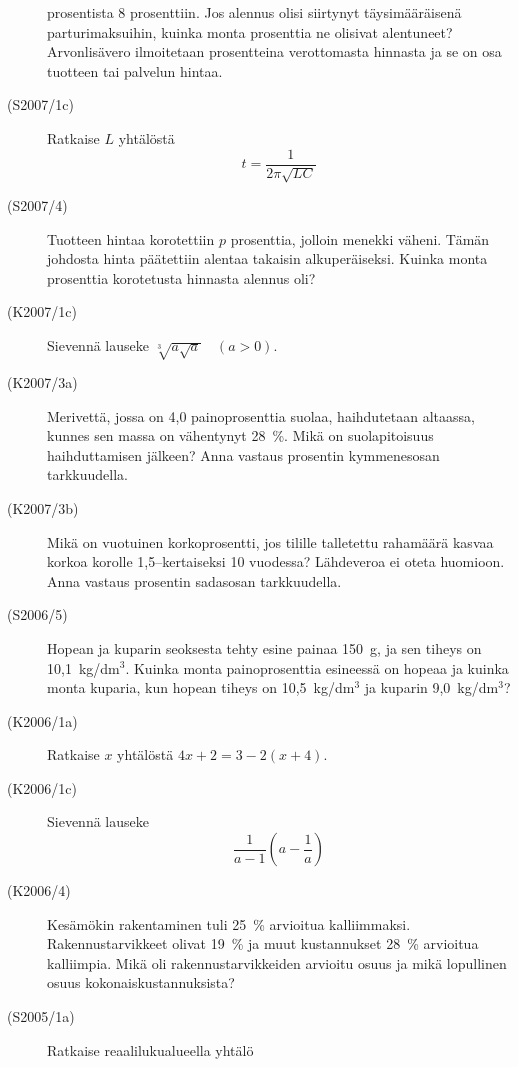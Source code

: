 \begin{description}
                        prosentista 8 prosenttiin. Jos alennus olisi siirtynyt
                        täysimääräisenä parturimaksuihin, kuinka monta prosenttia
                        ne olisivat alentuneet? Arvonlisävero ilmoitetaan prosentteina
                        verottomasta hinnasta ja se on osa tuotteen tai palvelun hintaa.
    \item[(S2007/1c)]  Ratkaise $L$ yhtälöstä
                        \[ t = \frac{1}{2\pi\sqrt{LC}} \]
    \item[(S2007/4)]   Tuotteen hintaa korotettiin $p$ prosenttia, jolloin menekki väheni.
                        Tämän johdosta hinta päätettiin alentaa takaisin alkuperäiseksi.
                        Kuinka monta prosenttia korotetusta hinnasta alennus oli?
    \item[(K2007/1c)]  Sievennä lauseke $ \sqrt[3]{a \sqrt{a}} \quad (a > 0) $.
    \item[(K2007/3a)]  Merivettä, jossa on 4,0 painoprosenttia suolaa, haihdutetaan
                        altaassa, kunnes sen massa on vähentynyt 28~\%. Mikä on
                        suolapitoisuus haihduttamisen jälkeen? Anna vastaus prosentin
                        kymmenesosan tarkkuudella. 
    \item[(K2007/3b)]  Mikä on vuotuinen korkoprosentti, jos tilille talletettu rahamäärä
                        kasvaa korkoa korolle 1,5--kertaiseksi 10 vuodessa? Lähdeveroa
                        ei oteta huomioon. Anna vastaus prosentin sadasosan 
                        tarkkuudella.
        \item[(S2006/5)]   Hopean ja kuparin seoksesta tehty esine painaa 150~g, ja sen
                       tiheys on 10,1~kg/dm\(^3\). Kuinka monta painoprosenttia 
                        esineessä on hopeaa ja kuinka monta kuparia, kun hopean tiheys on 
                        10,5~kg/dm\(^3\) ja kuparin 9,0~kg/dm\(^3\)?
    \item[(K2006/1a)]  Ratkaise $x$ yhtälöstä $4x + 2 =  3 - 2(x + 4)$.
    \item[(K2006/1c)]  Sievennä lauseke 
                        \[ \frac{1}{a - 1} \left( a - \frac{1}{a} \right) \]
     \item[(K2006/4)]   Kesämökin rakentaminen tuli 25~\% arvioitua kalliimmaksi.
 Rakennustarvikkeet olivat 19~\% ja muut kustannukset 28~\% 
                        arvioitua kalliimpia. Mikä oli rakennustarvikkeiden arvioitu osuus ja 
                        mikä lopullinen osuus kokonaiskustannuksista?
    \item[(S2005/1a)]  Ratkaise reaalilukualueella yhtälö 

\end{description}
